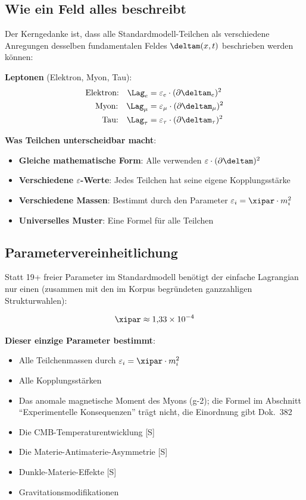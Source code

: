	\subsection{Wie ein Feld alles beschreibt}
	
	Der Kerngedanke ist, dass alle Standardmodell-Teilchen als verschiedene Anregungen desselben fundamentalen Feldes $\deltam(x,t)$ beschrieben werden können:
	
	\textbf{Leptonen} (Elektron, Myon, Tau):
	\begin{align}
		\text{Elektron:} \quad \Lag_e &= \varepsilon_e \cdot (\partial \deltam_e)^2 \\
		\text{Myon:} \quad \Lag_{\mu} &= \varepsilon_{\mu} \cdot (\partial \deltam_{\mu})^2 \\
		\text{Tau:} \quad \Lag_{\tau} &= \varepsilon_{\tau} \cdot (\partial \deltam_{\tau})^2
	\end{align}
	
	\textbf{Was Teilchen unterscheidbar macht}:
	\begin{itemize}
		\item \textbf{Gleiche mathematische Form}: Alle verwenden $\varepsilon \cdot (\partial \deltam)^2$
		\item \textbf{Verschiedene $\varepsilon$-Werte}: Jedes Teilchen hat seine eigene Kopplungsstärke
		\item \textbf{Verschiedene Massen}: Bestimmt durch den Parameter $\varepsilon_i = \xipar \cdot m_i^2$
		\item \textbf{Universelles Muster}: Eine Formel für alle Teilchen
	\end{itemize}
	
	\subsection{Parametervereinheitlichung}
	
	Statt 19+ freier Parameter im Standardmodell benötigt der einfache Lagrangian nur einen (zusammen mit den im Korpus begründeten ganzzahligen Strukturwahlen):
	
	\begin{equation}
		\xipar \approx 1{,}33 \times 10^{-4}
		\label{eq:universal_parameter}
	\end{equation}
	
	\textbf{Dieser einzige Parameter bestimmt}:
	\begin{itemize}
		\item Alle Teilchenmassen durch $\varepsilon_i = \xipar \cdot m_i^2$
		\item Alle Kopplungsstärken
		\item Das anomale magnetische Moment des Myons (g-2); die Formel im Abschnitt \enquote{Experimentelle Konsequenzen} trägt nicht, die Einordnung gibt Dok.~382
		\item Die CMB-Temperaturentwicklung [S]
		\item Die Materie-Antimaterie-Asymmetrie [S]
		\item Dunkle-Materie-Effekte [S]
		\item Gravitationsmodifikationen
	\end{itemize}
	
